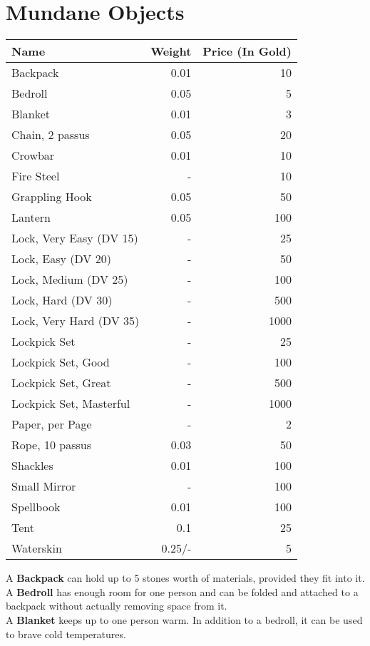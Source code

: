 \section{Mundane Objects}
\begin{longtable}{l | r | r}
	Name & Weight & Price (In Gold)\\ \hline
	Backpack & 0.01 & 10\\
	Bedroll & 0.05 & 5\\
	Blanket & 0.01 & 3\\
	Chain, 2 passus & 0.05 & 20\\
	Crowbar & 0.01 & 10\\
	Fire Steel & - & 10\\
	Grappling Hook & 0.05 & 50\\
	Lantern & 0.05 & 100\\
	Lock, Very Easy (DV 15) & - & 25\\
	Lock, Easy (DV 20) & - & 50\\
	Lock, Medium (DV 25) & - & 100\\
	Lock, Hard (DV 30) & - & 500\\
	Lock, Very Hard (DV 35) & - & 1000\\
	Lockpick Set & - & 25\\
	Lockpick Set, Good & - & 100\\
	Lockpick Set, Great & - & 500\\
	Lockpick Set, Masterful & - & 1000\\
	Paper, per Page & - & 2\\
	Rope, 10 passus & 0.03 & 50\\
	Shackles & 0.01 & 100\\
	Small Mirror & - & 100\\
	Spellbook & 0.01 & 100\\
	Tent & 0.1 & 25\\
	Waterskin & 0.25/- & 5\\
\end{longtable}



A \textbf{Backpack} can hold up to 5 stones worth of materials, provided they fit into it.\\

A \textbf{Bedroll} has enough room for one person and can be folded and attached to a backpack without actually removing space from it.\\

A \textbf{Blanket} keeps up to one person warm. In addition to a bedroll, it can be used to brave cold temperatures.\\

